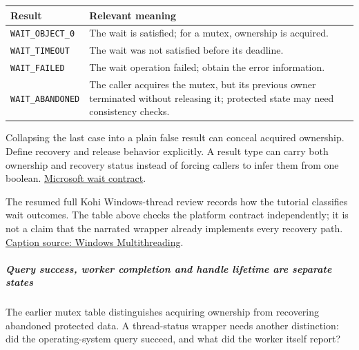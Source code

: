 {\def\LTcaptype{none} %
\begin{longtable}[]{@{}
  >{\raggedright\arraybackslash}p{}
  >{\raggedright\arraybackslash}p{}@{}}
\toprule\noalign{}
\begin{minipage}[b]{\linewidth}\raggedright
Result
\end{minipage} & \begin{minipage}[b]{\linewidth}\raggedright
Relevant meaning
\end{minipage} \\
\midrule\noalign{}
\endhead
\bottomrule\noalign{}
\endlastfoot
\texttt{WAIT\_OBJECT\_0} & The wait is satisfied; for a mutex, ownership is acquired. \\
\texttt{WAIT\_TIMEOUT} & The wait was not satisfied before its deadline. \\
\texttt{WAIT\_FAILED} & The wait operation failed; obtain the error information. \\
\texttt{WAIT\_ABANDONED} & The caller acquires the mutex, but its previous owner terminated without releasing it; protected state may need consistency checks. \\
\end{longtable}
}

Collapsing the last case into a plain false result can conceal acquired ownership. Define recovery and release behavior explicitly. A result type can carry both ownership and recovery status instead of forcing callers to infer them from one boolean. \href{https://learn.microsoft.com/en-us/windows/win32/api/synchapi/nf-synchapi-waitforsingleobject}{Microsoft wait contract}.

The resumed full Kohi Windows-thread review records how the tutorial classifies wait outcomes. The table above checks the platform contract independently; it is not a claim that the narrated wrapper already implements every recovery path. \href{https://www.youtube.com/watch?v=jmt_BE6ny1g}{Caption source: Windows Multithreading}.

\subparagraph{Query success, worker completion and handle lifetime are separate states}\label{query-success-worker-completion-and-handle-lifetime-are-separate-states}

The earlier mutex table distinguishes acquiring ownership from recovering abandoned protected data. A thread-status wrapper needs another distinction: did the operating-system query succeed, and what did the worker itself report?

